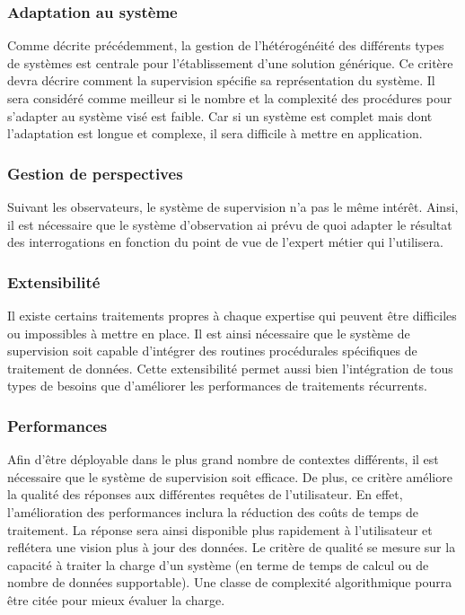 \subsubsection{Adaptation au système}\label{sec:rw:supervision:criteres:adaptation}
Comme décrite précédemment, la gestion de l'hétérogénéité des différents types de systèmes est centrale pour l'établissement d'une solution générique. Ce critère devra décrire comment la supervision spécifie sa représentation du système. Il sera considéré comme meilleur si le nombre et la complexité des procédures pour s'adapter au système visé est faible. Car si un système est complet mais dont l'adaptation est longue et complexe, il sera difficile à mettre en application.

\subsubsection{Gestion de perspectives}
Suivant les observateurs, le système de supervision n'a pas le même intérêt. Ainsi, il est nécessaire que le système d'observation ai prévu de quoi adapter le résultat des interrogations en fonction du point de vue de l'expert métier qui l'utilisera.

\subsubsection{Extensibilité}
Il existe certains traitements propres à chaque expertise qui peuvent être difficiles ou impossibles à mettre en place. Il est ainsi nécessaire que le système de supervision soit capable d'intégrer des routines procédurales spécifiques de traitement de données. Cette extensibilité permet aussi bien l'intégration de tous types de besoins que d'améliorer les performances de traitements récurrents.

\subsubsection{Performances}
Afin d'être déployable dans le plus grand nombre de contextes différents, il est nécessaire que le système de supervision soit efficace. De plus, ce critère améliore la qualité des réponses aux différentes requêtes de l'utilisateur. En effet, l'amélioration des performances inclura la réduction des coûts de temps de traitement. La réponse sera ainsi disponible plus rapidement à l'utilisateur et reflétera une vision plus à jour des données. Le critère de qualité se mesure sur la capacité à traiter la charge d'un système (en terme de temps de calcul ou de nombre de données supportable). Une classe de complexité algorithmique pourra être citée pour mieux évaluer la charge.

